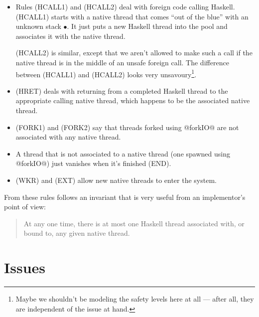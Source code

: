 \documentclass{article}
\begin{document}
\begin{itemize}
\item Rules (HCALL1) and (HCALL2) deal with foreign code calling Haskell.
(HCALL1) starts with a native thread that comes ``out of the blue'' with an
unknown stack $\bullet$. It just puts a new Haskell thread into the pool and
associates it with the native thread.

(HCALL2) is similar, except that we aren't allowed to make such a call if
the native thread is in the middle of an unsafe foreign call.  The difference
between (HCALL1) and (HCALL2) looks very unsavoury\footnote{Maybe we shouldn't
be modeling the safety levels here at all --- after all, they are independent
of the issue at hand.}.

\item (HRET) deals with returning from a completed Haskell thread to the
appropriate calling native thread, which happens to be the associated native
thread.

\item (FORK1) and (FORK2) say that threads forked using @forkIO@ are not
associated with any native thread.

\item A thread that is not associated to a native thread (one spawned using
@forkIO@) just vanishes when it's finished (END).

\item (WKR) and (EXT) allow new native threads to enter the system.

\end{itemize}

From these rules follows an invariant that is very useful from an implementor's
point of view:

\begin{quote}
  At any one time, there is at most one Haskell thread
  associated with, or bound to, any given native thread.
\end{quote}

\section{Issues}
\end{document}
